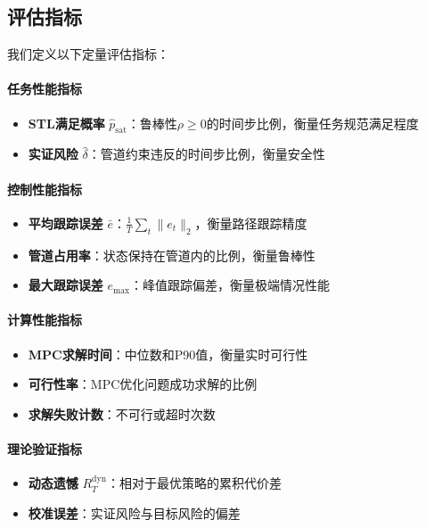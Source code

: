 \documentclass[12pt,a4paper]{ctexart}
\numberwithin{equation}{section}
\begin{document}
\subsection{评估指标}

我们定义以下定量评估指标：

\paragraph*{任务性能指标}
\begin{itemize}
    \item \textbf{STL满足概率} $\widehat{p}_{\mathrm{sat}}$：鲁棒性$\rho \ge 0$的时间步比例，衡量任务规范满足程度
    \item \textbf{实证风险} $\widehat{\delta}$：管道约束违反的时间步比例，衡量安全性
\end{itemize}

\paragraph*{控制性能指标}
\begin{itemize}
    \item \textbf{平均跟踪误差} $\bar{e}$：$\frac{1}{T}\sum_{t}\|e_t\|_2$，衡量路径跟踪精度
    \item \textbf{管道占用率}：状态保持在管道内的比例，衡量鲁棒性
    \item \textbf{最大跟踪误差} $e_{\max}$：峰值跟踪偏差，衡量极端情况性能
\end{itemize}

\paragraph*{计算性能指标}
\begin{itemize}
    \item \textbf{MPC求解时间}：中位数和P90值，衡量实时可行性
    \item \textbf{可行性率}：MPC优化问题成功求解的比例
    \item \textbf{求解失败计数}：不可行或超时次数
\end{itemize}

\paragraph*{理论验证指标}
\begin{itemize}
    \item \textbf{动态遗憾} $R_T^{\mathrm{dyn}}$：相对于最优策略的累积代价差
    \item \textbf{校准误差}：实证风险与目标风险的偏差
\end{itemize}
\end{document}
